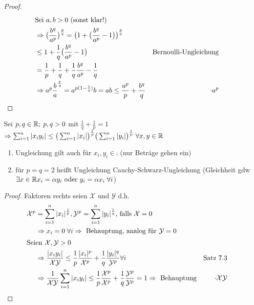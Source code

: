 \begin{proof} %
	\begin{align*}
	   \shortintertext{Sei $a,b > 0$ (sonst klar!)}
       &\Rightarrow \big(\frac{b^q}{a^p}\big)^{\frac{p}{q}} = \big(1+\big(\frac{b^q}{a^p} -1\big)\big)^{\frac{p}{q}}&\\ 
       &\leq 1+ \frac{1}{q}\big(\frac{b^q}{a^p} -1\big)& \text{Bernoulli-Ungleichung}\\ 
       &=\frac{1}{p}+\frac{1}{q}+\frac{1}{q}\frac{b^q}{a^p}-\frac{1}{q}\\
       &\Rightarrow a^p\frac{b}a^{\frac{p}{q}} = a^{p(1-\frac{1}{q})}b = ab \leq \frac{a^p}{p} + \frac{b^q}{q}& \cdot a^p 
	\end{align*}\QEDA
\end{proof}

\begin{satz}
    Sei $p,q \in \mathbb{R};\;p,q > 0$ mit $\frac{1}{q} + \frac{1}{p} = 1$\\
    $\Rightarrow \sum_{i=1}^{n} \vert x_i y_i\vert \leq \big( \sum_{i=1}^{n} \vert x_i \vert \big)^{\frac{1}{p}} \big( \sum_{i=1}^{n} \vert y_i \vert \big)^{\frac{1}{p}}\;\forall x,y \in \mathbb{R}$
\end{satz}

\begin{remark}
    \begin{enumerate}[label={\arabic*)}]
        \item Ungleichung gilt auch für $x_i,y_i \in \comp$ (nur Beträge gehen ein)
        \item für $p=q=2$ heißt Ungleichung Cauchy-Schwarz-Ungleichung (Gleichheit gdw $\exists x \in \mathbb{R} x_i = \alpha y_i \text{ oder } y_i = \alpha x_i\;\forall i$)
    \end{enumerate}
\end{remark}

\begin{proof}
	Faktoren rechts seien $\mathcal{X} \text{ und } \mathcal{Y}$ d.h.
    \begin{align*}
        \mathcal{X}^p &= \sum_{i=1}^{n} \vert x_i \vert^{\frac{1}{p}}, \mathcal{Y}^p = \sum_{i=1}^{n} \vert y_i \vert^{\frac{1}{q}}\text{, falls } \mathcal{X}=0&\\ &\Rightarrow x_i = 0\;\forall i \Rightarrow \text{ Behauptung} \text{, analog für } \mathcal{Y} =0&\\
        \shortintertext{Seien $\mathcal{X}, \mathcal{Y} > 0$} 
        &\Rightarrow \frac{\vert x_i y_i \vert}{\mathcal{XY}} \leq \frac{1}{p}\frac{\vert x_i \vert^p}{\mathcal{X}^p}+ \frac{1}{q}\frac{\vert y_i \vert^q}{\mathcal{Y}^p} \forall i& \text{Satz 7.3}\\
        &\Rightarrow \frac{1}{\mathcal{XY}}\sum_{i=1}^{n}\vert x_i y_i \vert \leq \frac{1}{p}\frac{\mathcal{X}^p}{\mathcal{X}^p}+\frac{1}{q}\frac{\mathcal{Y}^p}{\mathcal{Y}^p} = 1 \Rightarrow \text{ Behauptung} & \cdot \mathcal{XY}
    \end{align*}\QEDA
\end{proof}

